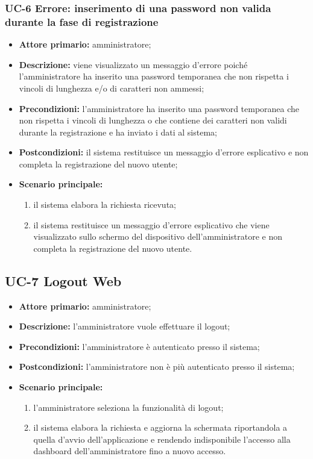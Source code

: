 \subsubsection{UC-6 Errore: inserimento di una password non valida durante la fase di registrazione}
\begin{itemize}
	\item \textbf{Attore primario:} amministratore;

	\item \textbf{Descrizione:} viene visualizzato un messaggio d'errore poiché l'amministratore ha inserito una password temporanea che non rispetta i vincoli di lunghezza e/o di caratteri non ammessi;

	\item \textbf{Precondizioni:} l'amministratore ha inserito una password temporanea che non rispetta i vincoli di lunghezza o che contiene dei caratteri non validi durante la registrazione e ha inviato i dati al sistema;

	\item \textbf{Postcondizioni:} il sistema restituisce un messaggio d'errore esplicativo e non completa la registrazione del nuovo utente;

	\item \textbf{Scenario principale:}
	      \begin{enumerate}
		      \item il sistema elabora la richiesta ricevuta;
		      \item il sistema restituisce un messaggio d'errore esplicativo che viene visualizzato sullo schermo del dispositivo dell'amministratore e non completa la registrazione del nuovo utente.
	      \end{enumerate}
\end{itemize}

\subsection{UC-7 Logout Web}
\begin{itemize}
	\item \textbf{Attore primario:} amministratore;

	\item \textbf{Descrizione:} l'amministratore vuole effettuare il logout;

	\item \textbf{Precondizioni:} l'amministratore è autenticato presso il sistema;

	\item \textbf{Postcondizioni:} l'amministratore non è più autenticato presso il sistema;

	\item \textbf{Scenario principale:}

	      \begin{enumerate}
		      \item l'amministratore seleziona la funzionalità di logout;
		      \item il sistema elabora la richiesta e aggiorna la schermata riportandola a quella d'avvio dell'applicazione e rendendo indisponibile l'accesso alla dashboard dell'amministratore fino a nuovo accesso.
	      \end{enumerate}
\end{itemize}